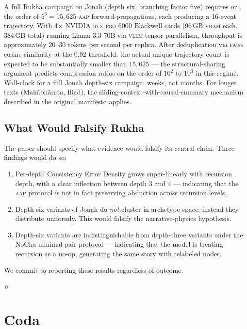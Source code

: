 \documentclass[11pt]{article}
\theoremstyle{rukha}
\newcommand{\diamondrule}{%
  \begin{center}\vspace{0.6em}%
  {\scriptsize $\diamond$}\vspace{0.6em}\end{center}}
\begin{document}
A full Rukha campaign on Jonah (depth six, branching factor five)
requires on the order of $5^6 = 15{,}625$ \textsc{aap}
forward-propagations, each producing a 16-event trajectory. With
4× NVIDIA \textsc{rtx pro} 6000 Blackwell cards (96\,GB \textsc{vram}
each, 384\,GB total) running Llama 3.3 70B via \textsc{vllm} tensor
parallelism, throughput is approximately 20--30 tokens per second per
replica. After deduplication via \textsc{faiss} cosine
similarity at the 0.92 threshold, the actual unique trajectory count is
expected to be substantially smaller than $15{,}625$ --- the
structural-sharing argument predicts compression ratios on the order of
$10^2$ to $10^3$ in this regime. Wall-clock for a full Jonah depth-six
campaign: weeks, not months. For longer texts (Mahābhārata, Iliad), the
sliding-context-with-causal-summary mechanism described in the original
manifesto applies.

\subsection{What Would Falsify Rukha}

The paper should specify what evidence would falsify its central claim.
Three findings would do so:

\begin{enumerate}
  \item Per-depth Consistency Error Density grows super-linearly with
    recursion depth, with a clear inflection between depth 3 and 4 ---
    indicating that the \textsc{aap} protocol is not in fact preserving
    abduction across recursion levels.
  \item Depth-six variants of Jonah do \emph{not} cluster in
    archetype space; instead they distribute uniformly. This would
    falsify the narrative-physics hypothesis.
  \item Depth-six variants are indistinguishable from depth-three
    variants under the NoCha minimal-pair protocol --- indicating that
    the model is treating recursion as a no-op, generating the same
    story with relabeled nodes.
\end{enumerate}

We commit to reporting these results regardless of outcome.

\diamondrule

\section{Coda}
\end{document}
